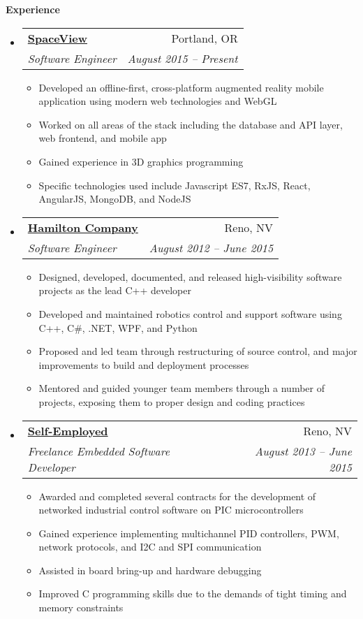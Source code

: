 \documentclass[letterpaper,11pt]{article}
\makeatletter
\newcommand{\resitem}[1]{\item #1 \vspace{-2pt}}
\newcommand{\resheading}[1]{{\large \colorbox{mygrey}{\begin{minipage}{\textwidth}{\textbf{#1 \vphantom{p\^{E}}}}\end{minipage}}}}
\newcommand{\ressubheading}[4]{
\begin{tabular*}{6.5in}{l@{\extracolsep{\fill}}r}
		\textbf{#1} & #2 \\
		\textit{#3} & \textit{#4} \\
\end{tabular*}\vspace{-6pt}}
\makeatother
\begin{document}
\resheading{Experience}
	\begin{itemize}
		\item
			\ressubheading{\href{http://www.space.vu/}{SpaceView}}{Portland, OR}{Software Engineer}{August 2015 -- Present}
				{ \footnotesize
				\begin{itemize}
					\resitem{Developed an offline-first, cross-platform augmented reality mobile application using modern web technologies and WebGL}
                    \resitem{Worked on all areas of the stack including the database and API layer, web frontend, and mobile app}
                    \resitem{Gained experience in 3D graphics programming}
                    \resitem{Specific technologies used include Javascript ES7, RxJS, React, AngularJS, MongoDB, and NodeJS}
				\end{itemize}
				}
		\item
			\ressubheading{\href{http://www.hamiltoncompany.com/}{Hamilton Company}}{Reno, NV}{Software Engineer}{August 2012 -- June 2015}
				{ \footnotesize
				\begin{itemize}
					\resitem{Designed, developed, documented, and released high-visibility software projects as the lead C++ developer}
					\resitem{Developed and maintained robotics control and support software using C++, C\#, .NET, WPF, and Python}
					\resitem{Proposed and led team through restructuring of source control, and major improvements to build and deployment processes}
					\resitem{Mentored and guided younger team members through a number of projects, exposing them to proper design and coding practices}
				\end{itemize}
				}

		\item
			\ressubheading{\href{https://www.linkedin.com/in/gferneyhough}{Self-Employed}}{Reno, NV}{Freelance Embedded Software Developer}{August 2013 -- June 2015}
				{ \footnotesize
				\begin{itemize}
					\resitem{Awarded and completed several contracts for the development of networked industrial control software on PIC microcontrollers}
					\resitem{Gained experience implementing multichannel PID controllers, PWM, network protocols, and I2C and SPI communication}
					\resitem{Assisted in board bring-up and hardware debugging}
					\resitem{Improved C programming skills due to the demands of tight timing and memory constraints}
				\end{itemize}
				}


\end{itemize}
\end{document}
